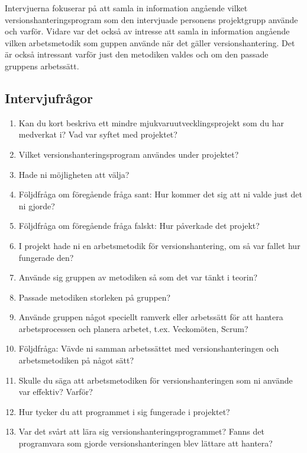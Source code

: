 Intervjuerna fokuserar på att samla in information angående vilket versionshanteringsprogram som den intervjuade personens projektgrupp använde och varför. Vidare var det också av intresse att samla in information angående vilken arbetsmetodik som guppen använde när det gäller versionshantering. Det är också intressant varför just den metodiken valdes och om den passade gruppens arbetssätt.

\subsection{ Intervjufrågor } \vspace{1em}
\begin{enumerate}

  \item Kan du kort beskriva ett mindre mjukvaruutvecklingsprojekt som du har medverkat i? Vad var syftet med projektet?

  \item Vilket versionshanteringsprogram användes under projektet?

  \item Hade ni möjligheten att välja?

  \item Följdfråga om föregående fråga sant: Hur kommer det sig att ni valde just det ni gjorde?
  \item Följdfråga om föregående fråga falskt: Hur påverkade det projekt?

  \item I projekt hade ni en arbetsmetodik för versionshantering, om så var fallet hur fungerade den?

  \item Använde sig gruppen av metodiken så som det var tänkt i teorin?

  \item Passade metodiken storleken på gruppen?

  \item Använde gruppen något speciellt ramverk eller arbetssätt för att hantera arbetsprocessen och planera arbetet, t.ex. Veckomöten, Scrum?

  \item Följdfråga: Vävde ni samman arbetssättet med versionshanteringen och arbetsmetodiken på något sätt?

  \item Skulle du säga att arbetsmetodiken för versionshanteringen som ni använde var effektiv? Varför?

  \item Hur tycker du att programmet i sig fungerade i projektet?

  \item Var det svårt att lära sig versionshanteringsprogrammet? Fanns det programvara som gjorde versionshanteringen blev lättare att hantera?

\end{enumerate}

